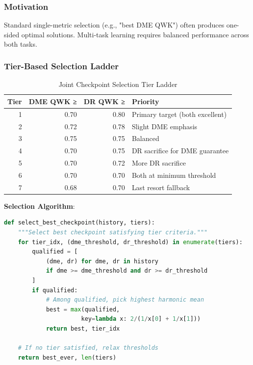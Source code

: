 \subsubsection{Motivation}

Standard single-metric selection (e.g., "best DME QWK") often produces one-sided optimal solutions. Multi-task learning requires balanced performance across both tasks.

\subsubsection{Tier-Based Selection Ladder}

\begin{table}[H]
\centering
\small
\caption{Joint Checkpoint Selection Tier Ladder}
\begin{tabular}{|r|r|r|l|}
\hline
\textbf{Tier} & \textbf{DME QWK ≥} & \textbf{DR QWK ≥} & \textbf{Priority} \\
\hline
1 & 0.70 & 0.80 & Primary target (both excellent) \\
2 & 0.72 & 0.78 & Slight DME emphasis \\
3 & 0.75 & 0.75 & Balanced \\
4 & 0.70 & 0.75 & DR sacrifice for DME guarantee \\
5 & 0.70 & 0.72 & More DR sacrifice \\
6 & 0.70 & 0.70 & Both at minimum threshold \\
7 & 0.68 & 0.70 & Last resort fallback \\
\hline
\end{tabular}
\end{table}

\textbf{Selection Algorithm}:

\begin{lstlisting}[language=python]
def select_best_checkpoint(history, tiers):
    """Select best checkpoint satisfying tier criteria."""
    for tier_idx, (dme_threshold, dr_threshold) in enumerate(tiers):
        qualified = [
            (dme, dr) for dme, dr in history
            if dme >= dme_threshold and dr >= dr_threshold
        ]
        if qualified:
            # Among qualified, pick highest harmonic mean
            best = max(qualified, 
                      key=lambda x: 2/(1/x[0] + 1/x[1]))
            return best, tier_idx
    
    # If no tier satisfied, relax thresholds
    return best_ever, len(tiers)
\end{lstlisting}

